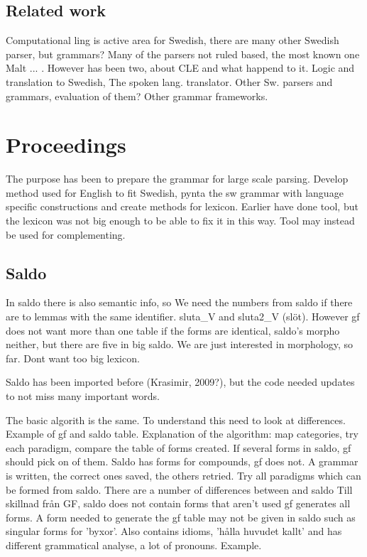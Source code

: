 \documentclass{report}
\begin{document}
\section{Related work}
Computational ling is active area for Swedish, there are many other Swedish parser,
but grammars?
Many of the parsers not ruled based, the most known one Malt ... .
However has been two, about CLE and what happend to it. Logic and translation
to Swedish, The spoken lang. translator.
Other Sw. parsers and grammars, evaluation of them? 
Other grammar frameworks.

\chapter{Proceedings}
The purpose has been to prepare the grammar for large scale parsing.
Develop method used for English to fit Swedish, pynta the sw grammar with
language specific constructions and create methods for lexicon.
Earlier have done tool, but the lexicon was not big enough to be able
to fix it in this way. Tool may instead be used for complementing.

\section{Saldo}
\label{sec:prog.saldo}
In saldo there is also semantic info, so
We need the numbers from saldo if there are to lemmas with the same
identifier. sluta\_V and sluta2\_V (slöt). However gf does not want more than one table
if the forms are identical, saldo's morpho neither, but there are five in big saldo. 
We are just interested in morphology, so far. Dont want too big lexicon.

Saldo has been imported before (Krasimir, 2009?), but the code needed updates
to not miss many important words.

The basic algorith is the same. To understand this need to look at differences.
Example of gf and saldo table.
Explanation of the algorithm: map categories, try each paradigm, compare the table of forms
created. If several forms in saldo, gf should pick on of them. Saldo has forms for
compounds, gf does not. A grammar is written, the correct ones saved, the others 
retried. Try all paradigms which can be formed from saldo. 
There are a number of differences between and saldo Till skillnad från GF,
saldo does not contain forms that aren't used gf generates all forms. A form
needed to generate the gf table may not be given in saldo such as singular
forms for 'byxor'. Also contains idioms, 'hålla huvudet kallt' and has
different grammatical analyse, a lot of pronouns. Example. 
\end{document}

